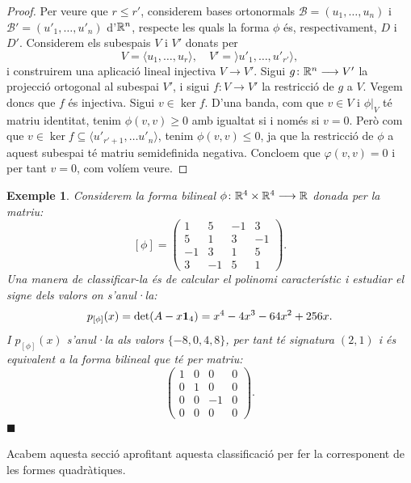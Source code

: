 \documentclass[
  11pt,
]{book}
\numberwithin{dummy}{section}
\theoremstyle{maincolornumbox}
\theoremstyle{blacknumex}
\newtheorem{exampleT}{Exemple}[chapter]
\theoremstyle{blacknumbox}
\theoremstyle{maincolornum}
\newenvironment{example}{\begin{exampleT}}{\hfill{\tiny\ensuremath{\blacksquare}}\end{exampleT}}
\newlength\esp
\begin{document}
\begin{proof}
Per veure que \(r\leq r'\), considerem bases ortonormals
\(\mathcal{B}=(u_1,\ldots, u_n)\) i \(\mathcal{B'}=(u'_1,\ldots,u'_n)\)
d'\(\mathbb{R}^n\), respecte les quals la forma \(\phi\) és, respectivament, \(D\) i
\(D'\). Considerem els subespais \(V\) i \(V'\) donats per
\[V = \langle u_1,\ldots, u_r\rangle,\quad V'=\rangle u'_1,\ldots, u'_{r'}\rangle,\]
i construirem una aplicació lineal injectiva \(V\to V'\). Sigui
\(g \colon \mathbb{R}^n\longrightarrow V'\) la projecció ortogonal al subespai \(V'\), i sigui
\(f \colon V \to V'\) la restricció de \(g\) a \(V\). Vegem doncs que \(f\) és
injectiva. Sigui \(v\in\ker f\). D'una banda, com que \(v\in V\) i \(\phi|_V\)
té matriu identitat, tenim \(\phi(v,v) \geq 0\) amb igualtat si i només si
\(v=0\). Però com que
\(v\in \ker f \subseteq \langle u'_{r'+1},\ldots u'_n\rangle\), tenim
\(\phi(v,v)\leq 0\), ja que la restricció de \(\phi\) a aquest subespai té
matriu semidefinida negativa. Concloem que \(\varphi(v,v)=0\) i per tant
\(v=0\), com volíem veure.
\end{proof}

\begin{example}
\protect\hypertarget{exm:class-form-bil}{}\label{exm:class-form-bil}Considerem la
forma bilineal \(\phi\colon \mathbb{R}^4\times\mathbb{R}^4\longrightarrow\mathbb{R}\) donada per la matriu:
\[[\phi]=\left(\begin{array}{rrrr}
1 & 5 & -1 & 3 \\
5 & 1 & 3 & -1 \\
-1 & 3 & 1 & 5 \\
3 & -1 & 5 & 1
\end{array}\right).\] Una manera de classificar-la és de calcular el
polinomi característic i estudiar el signe dels valors on s'anul·la:
\[p_{[\phi]}(x)=\det(A-x\mathbf{1}_4)=x^{4} - 4 x^{3} - 64 x^{2} + 256 x .\] I
\(p_{[\phi]}(x)\) s'anul·la als valors \(\{-8,0,4,8\}\), per tant té
signatura \((2,1)\) i és equivalent a la forma bilineal que té per matriu:
\[\begin{pmatrix} 1 & 0 & 0 & 0 \\ 0 & 1 & 0 & 0 \\ 0 & 0 & -1 & 0 \\ 0 & 0 & 0 & 0 \end{pmatrix} .\]
\end{example}

Acabem aquesta secció aprofitant aquesta classificació per fer la
corresponent de les formes quadràtiques.
\end{document}
